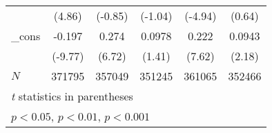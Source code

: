 \begin{table}[htbp]
\begin{tabular}{l*{5}{c}}
            &      (4.86)         &     (-0.85)         &     (-1.04)         &     (-4.94)         &      (0.64)         \\
\_cons      &      -0.197\sym{***}&       0.274\sym{***}&      0.0978         &       0.222\sym{***}&      0.0943\sym{*}  \\
            &     (-9.77)         &      (6.72)         &      (1.41)         &      (7.62)         &      (2.18)         \\
\hline
\(N\)       &      371795         &      357049         &      351245         &      361065         &      352466         \\
\hline\hline
\multicolumn{6}{l}{\footnotesize \textit{t} statistics in parentheses}\\
\multicolumn{6}{l}{\footnotesize \sym{*} \(p<0.05\), \sym{**} \(p<0.01\), \sym{***} \(p<0.001\)}\\
\end{tabular}
\end{table}
